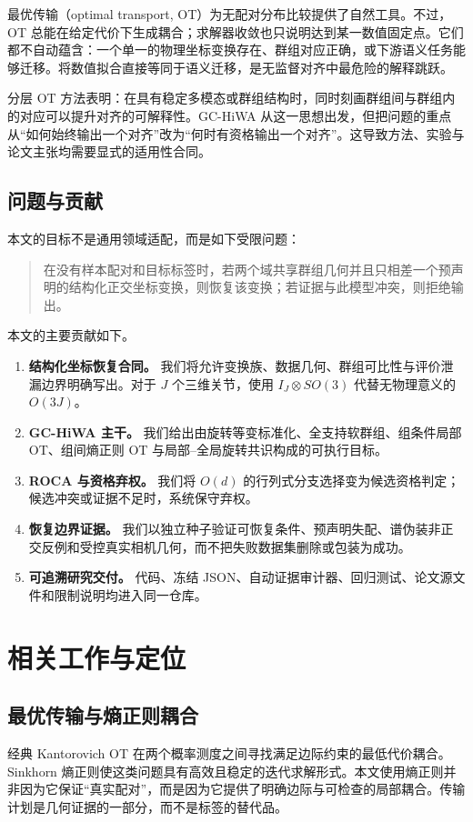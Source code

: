 \documentclass[10pt,a4paper,fontset=windows]{ctexart}
\theoremstyle{definition}
\theoremstyle{remark}
\begin{document}
最优传输（optimal transport, OT）为无配对分布比较提供了自然工具\cite{peyre2019computational,cuturi2013sinkhorn}。不过，OT 总能在给定代价下生成耦合；求解器收敛也只说明达到某一数值固定点。它们都不自动蕴含：一个单一的物理坐标变换存在、群组对应正确，或下游语义任务能够迁移。将数值拟合直接等同于语义迁移，是无监督对齐中最危险的解释跳跃。

分层 OT 方法表明：在具有稳定多模态或群组结构时，同时刻画群组间与群组内的对应可以提升对齐的可解释性\cite{lee2019hierarchical}。GC-HiWA 从这一思想出发，但把问题的重点从“如何始终输出一个对齐”改为“何时有资格输出一个对齐”。这导致方法、实验与论文主张均需要显式的适用性合同。

\subsection{问题与贡献}
本文的目标不是通用领域适配，而是如下受限问题：
\begin{quote}
在没有样本配对和目标标签时，若两个域共享群组几何并且只相差一个预声明的结构化正交坐标变换，则恢复该变换；若证据与此模型冲突，则拒绝输出。
\end{quote}

本文的主要贡献如下。
\begin{enumerate}
  \item \textbf{结构化坐标恢复合同。} 我们将允许变换族、数据几何、群组可比性与评价泄漏边界明确写出。对于 $J$ 个三维关节，使用 $I_J\otimes SO(3)$ 代替无物理意义的 $O(3J)$。
  \item \textbf{GC-HiWA 主干。} 我们给出由旋转等变标准化、全支持软群组、组条件局部 OT、组间熵正则 OT 与局部--全局旋转共识构成的可执行目标。
  \item \textbf{ROCA 与资格弃权。} 我们将 $O(d)$ 的行列式分支选择变为候选资格判定；候选冲突或证据不足时，系统保守弃权。
  \item \textbf{恢复边界证据。} 我们以独立种子验证可恢复条件、预声明失配、谱伪装非正交反例和受控真实相机几何，而不把失败数据集删除或包装为成功。
  \item \textbf{可追溯研究交付。} 代码、冻结 JSON、自动证据审计器、回归测试、论文源文件和限制说明均进入同一仓库。
\end{enumerate}

\section{相关工作与定位}

\subsection{最优传输与熵正则耦合}
经典 Kantorovich OT 在两个概率测度之间寻找满足边际约束的最低代价耦合。Sinkhorn 熵正则使这类问题具有高效且稳定的迭代求解形式\cite{cuturi2013sinkhorn,peyre2019computational}。本文使用熵正则并非因为它保证“真实配对”，而是因为它提供了明确边际与可检查的局部耦合。传输计划是几何证据的一部分，而不是标签的替代品。
\end{document}
